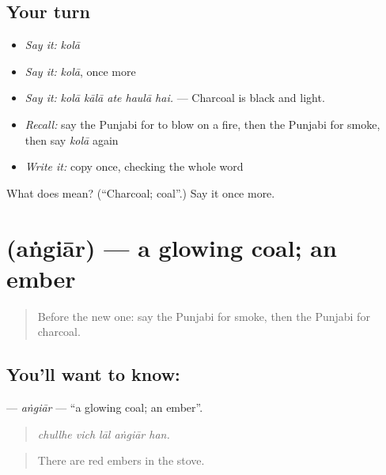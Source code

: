 \subsection*{Your turn}
\begin{itemize}
\raggedright
  \item \emph{Say it:} \emph{kolā}
  \item \emph{Say it:} \emph{kolā}, once more
  \item \emph{Say it:} \emph{kolā kālā ate haulā hai.} — Charcoal is black and light.
  \item \emph{Recall:} say the Punjabi for to blow on a fire, then the Punjabi for smoke, then say \emph{kolā} again
  \item \emph{Write it:} copy \textbf{} once, checking the whole word
\end{itemize}

\begin{tcolorbox}[breakable,colback=teal!4,colframe=teal!35!black,title={Before you move on}]
What does  mean? (\textquotedblleft{}Charcoal; coal\textquotedblright{}.) Say it once more.
\end{tcolorbox}
\section[\texorpdfstring{\pa{ਅੰਗਿਆਰ} (aṅgiār)}{ਅੰਗਿਆਰ (aṅgiār)}]{ (aṅgiār) — a glowing coal; an ember}

\label{lesson:PA-C249-angiar}



\begin{quote}
Before the new one: say the Punjabi for smoke, then the Punjabi for charcoal.
\end{quote}

\subsection*{You'll want to know: }
\textbf{} — \emph{aṅgiār} — \textquotedblleft{}a glowing coal; an ember\textquotedblright{}.

\begin{quote}
    
\end{quote}

\begin{quote}
\emph{chullhe vich lāl aṅgiār han.}
\end{quote}

\begin{quote}
There are red embers in the stove.
\end{quote}

